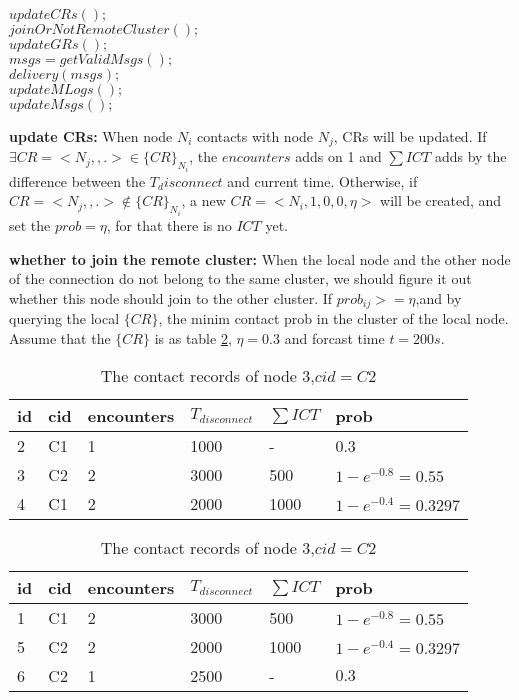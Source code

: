 \begin{algorithm}[!h]\label{algorithm_connecting}
\caption{algorithm when a connection is established}
\begin{algorithmic}
\STATE $updateCRs();$\\
\STATE $joinOrNotRemoteCluster();$\\
\ENDIF 
\STATE $updateGRs();$\\
\STATE $msgs = getValidMsgs();$\\
\STATE $delivery(msgs);$\\
\STATE $updateMLogs();$\\
\STATE $updateMsgs();$\\
\end{algorithmic}
\end{algorithm}



\textbf{update CRs:} When node $N_i$ contacts with node $N_j$, CRs will be updated. If $\exists CR=<N_j,,.>\in \{CR\}_{N_i}$, the $encounters$ adds on 1 and $\sum ICT$ adds by the difference between the $T_disconnect$ and current time. Otherwise, if $CR=<N_j,,.>\notin \{CR\}_{N_i}$, a new $CR=<N_i,1,0,0,\eta>$ will be created, and set the $prob=\eta$, for that there is no $ICT$ yet.

\textbf{whether to join the remote cluster:} When the local node and the other node of the connection do not belong to the same cluster, we should figure it out whether this node should join to the other cluster. If $prob_{ij}>=\eta$,and by querying the local $\{CR\}$, the minim contact prob in the cluster of the local node. Assume that the $\{CR\}$ is as table \ref{table_crs}, $\eta=0.3$ and forcast time $t=200s$.
\begin{table}[!h]\label{table_crs}
\caption{The contact records of node1,$cid=C1$}
\begin{tabular}{l|l|l|l|l|l}
  \hline
  \textbf{id}&\textbf{cid}&\textbf{encounters}&\textbf{$T_{disconnect}$}&\textbf{$\sum ICT$}&\textbf{prob}\\
  \hline
  2 & C1 & 1 & 1000 & - & 0.3 \\
  3 & C2 & 2 & 3000 & 500 & $1-e^{-0.8}=0.55$\\
  4 & C1 & 2 & 2000 & 1000 & $1-e^{-0.4}=0.3297$ \\
  \hline
\end{tabular}
\caption{The contact records of node 3,$cid=C2$}
\begin{tabular}{l|l|l|l|l|l}
  \hline
  \textbf{id}&\textbf{cid}&\textbf{encounters}&\textbf{$T_{disconnect}$}&\textbf{$\sum ICT$}&\textbf{prob}\\
  \hline
  1 & C1 & 2 & 3000 & 500 & $1-e^{-0.8}=0.55$\\
  5 & C2 & 2 & 2000 & 1000 & $1-e^{-0.4}=0.3297$ \\
  6 & C2 & 1 & 2500 & - & $0.3$ \\
  \hline
\end{tabular}
\end{table}

